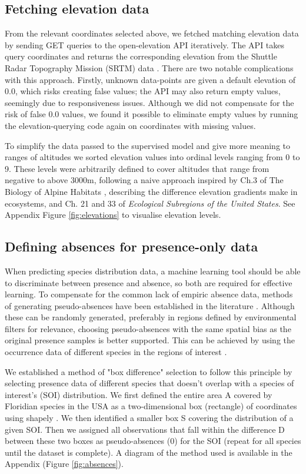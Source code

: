 \documentclass{article}
\begin{document}
\subsection{Fetching elevation data}
From the relevant coordinates selected above, we fetched matching elevation data by sending GET queries to the open-elevation API \cite{open-elevation} iteratively. The API takes query coordinates and returns the corresponding elevation from the Shuttle Radar Topography Mission (SRTM) data \cite{SRTM}. There are two notable complications with this approach. Firstly, unknown data-points are given a default elevation of 0.0, which risks creating false values; the API may also return empty values, seemingly due to responsiveness issues. Although we did not compensate for the risk of false 0.0 values, we found it possible to eliminate empty values by running the elevation-querying code again on coordinates with missing values.

To simplify the data passed to the supervised model and give more meaning to ranges of altitudes we sorted elevation values into ordinal levels ranging from 0 to 9. These levels  were arbitrarily defined to cover altitudes that range from negative to above 3000m, following a naive approach inspired by Ch.3 of The Biology of Alpine Habitats \cite{elevation-gradients}, describing the difference elevation gradients make in ecosystems, and Ch. 21 \cite{ch21} and 33 \cite{ch33} of \textit{Ecological Subregions of the United States}. See Appendix Figure \ref{fig:elevations} to visualise elevation levels.


\subsection{Defining absences for presence-only data}
When predicting species distribution data, a machine learning tool should be able to discriminate between presence and absence, so both are required for effective learning. To compensate for the common lack of empiric absence data, methods of generating pseudo-absences have been established in the literature \cite{pa-review}. Although these can be randomly generated, preferably in regions defined by environmental filters for relevance, choosing pseudo-absences with the same spatial bias as the original presence samples is better supported. This can be achieved by using the occurrence data of different species in the regions of interest \cite{pa-samebias}. 

We established a method of "box difference" selection to follow this principle by selecting presence data of different species that doesn't overlap with a species of interest's (SOI) distribution. We first defined the entire area A covered by Floridian species in the USA as a two-dimensional box (rectangle) of coordinates using shapely \cite{shapely}. We then identified a smaller box S covering the distribution of a given SOI. Then we assigned all observations that fall within the difference D between these two boxes as pseudo-absences (0) for the SOI (repeat for all species until the dataset is complete). A diagram of the method used is available in the Appendix (Figure \ref{fig:absences}).
\end{document}
